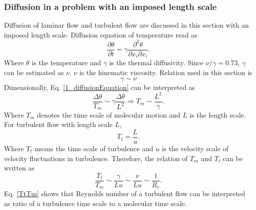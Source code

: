 \documentclass[review]{elsarticle}
\begin{document}
		\subsubsection{Diffusion in a problem with an imposed length scale}
			Diffusion of laminar flow and turbulent flow are discussed in this section with an imposed length scale.
			Diffusion equation of temperature read as
			\begin{equation}\label{1_diffusionEquation}
				\frac{\partial \theta}{\partial {t}}=\gamma \frac{\partial ^2\theta}{\partial x_i\partial x_i}.
			\end{equation}
			Where $\theta$ is the temperature and $\gamma$ is the thermal diffusivity. Since $\nu / \gamma = 0.73$, $\gamma$ 
			can be estimated as $\nu$. $\nu$ is the kinematic viscosity.
			Relation used in this section is
			\begin{equation}
				\gamma \sim \nu
			\end{equation}
			Dimensionally, Eq. \ref{1_diffusionEquation} can be interpreted as
			\begin{equation}
				\frac{\Delta \theta}{T_m} \sim \gamma \frac{\Delta \theta}{L^2} \Rightarrow T_m \sim \frac{L^2}{\gamma}.
			\end{equation}
			Where $T_m$ denotes the time scale of molecular motion and $L$ is the length scale.
			For turbulent flow with length scale $L$, 
			\begin{equation}
				T_t = \frac{L}{u}.
			\end{equation}
			Where $T_t$ means the time scale of turbulence and $u$ is the velocity scale of velocity fluctuations in turbulence.
			Therefore, the relation of $T_m$ and $T_t$ can be written as
			\begin{equation}\label{TtTm}
				\frac{T_t}{T_m} \sim \frac{\gamma}{Lu} \sim \frac{\nu}{Lu} \sim \frac{1}{R_e}.
			\end{equation}
			Eq. \ref{TtTm} shows that Reynolds number of a turbulent flow can be interpreted as ratio of a turbulence time scale to 
			a molecular time scale.
			\begin{center}
			\end{center}
\end{document}
